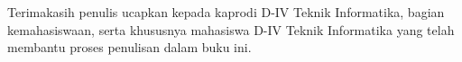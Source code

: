 Terimakasih penulis ucapkan kepada kaprodi D-IV Teknik Informatika, bagian kemahasiswaan, serta khususnya mahasiswa D-IV Teknik Informatika yang telah membantu proses penulisan dalam buku ini.